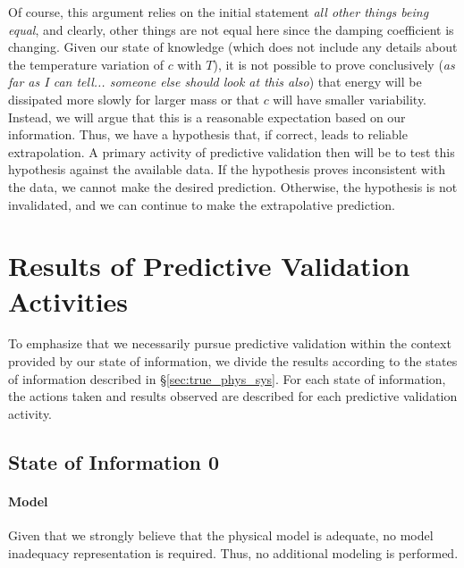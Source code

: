 \documentclass[11pt]{article}
\begin{document}
Of course, this argument relies on the initial statement \emph{all
  other things being equal}, and clearly, other things are not equal
here since the damping coefficient is changing.  Given our state of
knowledge (which does not include any details about the temperature
variation of $c$ with $T$), it is not possible to prove conclusively
(\emph{as far as I can tell... someone else should look at this also})
that energy will be dissipated more slowly for larger mass or that $c$
will have smaller variability.  Instead, we will argue that this is a
reasonable expectation based on our information.  Thus, we have a
hypothesis that, if correct, leads to reliable extrapolation.  A
primary activity of predictive validation then will be to test this
hypothesis against the available data.  If the hypothesis proves
inconsistent with the data, we cannot make the desired prediction.
Otherwise, the hypothesis is not invalidated, and we can continue to
make the extrapolative prediction.


\section{Results of Predictive Validation Activities}
To emphasize that we necessarily pursue predictive validation within
the context provided by our state of information, we divide the
results according to the states of information described in
\S\ref{sec:true_phys_sys}.  For each state of information, the actions
taken and results observed are described for each predictive
validation activity.


\subsection{State of Information 0}

\paragraph{Model}
Given that we strongly believe that the physical model is adequate, no
model inadequacy representation is required.  Thus, no additional
modeling is performed.
\end{document}
